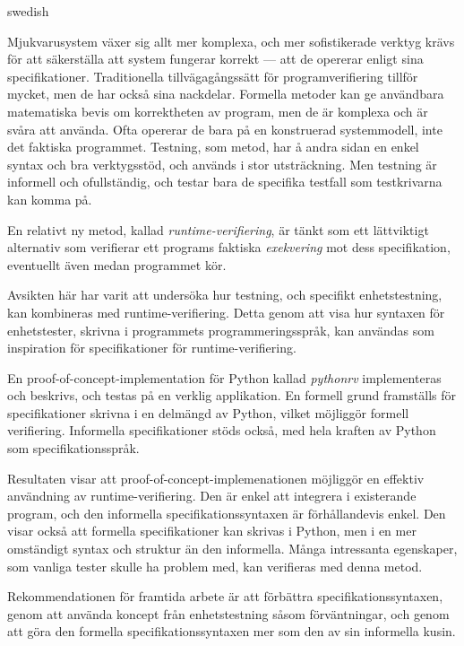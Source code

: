 \begin{foreignabstract}{swedish}

Mjukvarusystem växer sig allt mer komplexa, och mer sofistikerade verktyg
krävs för att säkerställa att system fungerar korrekt --- att de opererar
enligt sina specifikationer. Traditionella tillvägagångssätt för
programverifiering tillför mycket, men de har också sina nackdelar. Formella
metoder kan ge användbara matematiska bevis om korrektheten av program, men de
är komplexa och är svåra att använda. Ofta opererar de bara på en
konstruerad systemmodell, inte det faktiska programmet. Testning, som metod,
har å andra sidan en enkel syntax och bra verktygsstöd, och används i stor
utsträckning. Men testning är informell och ofullständig, och testar bara de
specifika testfall som testkrivarna kan komma på.

En relativt ny metod, kallad \textit{runtime-verifiering}, är tänkt som ett
lättviktigt alternativ som verifierar ett programs faktiska \textit{exekvering}
mot dess specifikation, eventuellt även medan programmet kör.

Avsikten här har varit att undersöka hur testning, och specifikt
enhetstestning, kan kombineras med runtime-verifiering. Detta genom att visa
hur syntaxen för enhetstester, skrivna i programmets programmeringsspråk, kan
användas som inspiration för specifikationer för runtime-verifiering.

En proof-of-concept-implementation för Python kallad \textit{pythonrv}
implementeras och beskrivs, och testas på en verklig applikation. En formell
grund framställs för specifikationer skrivna i en delmängd av Python, vilket
möjliggör formell verifiering. Informella specifikationer stöds också, med hela
kraften av Python som specifikationsspråk.

Resultaten visar att proof-of-concept-implemenationen möjliggör en effektiv
användning av runtime-verifiering. Den är enkel att integrera i existerande
program, och den informella specifikationssyntaxen är förhållandevis enkel. Den
visar också att formella specifikationer kan skrivas i Python, men i en mer
omständigt syntax och struktur än den informella. Många intressanta egenskaper,
som vanliga tester skulle ha problem med, kan verifieras med denna metod.

Rekommendationen för framtida arbete är att förbättra specifikationssyntaxen,
genom att använda koncept från enhetstestning såsom förväntningar, och genom
att göra den formella specifikationssyntaxen mer som den av sin informella
kusin.

\end{foreignabstract}
